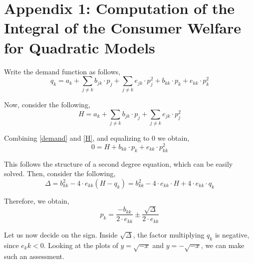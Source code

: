 \documentclass[12pt]{article}
\begin{document}
\newpage
\listoffigures

\newpage
\listoftables

\newpage
\section*{Appendix 1: Computation of the Integral of the Consumer Welfare for Quadratic Models}

Write the demand function as follows,
\begin{equation} \label{demand}
q_k = a_k + \sum_{j \neq k} b_{jk} \cdot p_j + \sum_{j \neq k} e_{jk} \cdot p_j^2 + b_{kk} \cdot p_k + e_{kk} \cdot p_k^2
\end{equation}

Now, consider the following,
\begin{equation} \label{H}
H = a_k + \sum_{j \neq k} b_{jk} \cdot p_j + \sum_{j \neq k} e_{jk} \cdot p_j^2
\end{equation}

Combining \ref{demand} and \ref{H}, and equalizing to $0$ we obtain,
\begin{equation*}
0 = H + b_{kk} \cdot p_k + e_{kk} \cdot p_{kk}^2
\end{equation*}

This follows the structure of a second degree equation, which can be easily solved. Then, consider the following,
\begin{equation*}
\Delta = b_{kk}^2 - 4 \cdot e_{kk} (H - q_k) = b_{kk}^2 - 4 \cdot e_{kk} \cdot H + 4 \cdot e_{kk} \cdot q_k 
\end{equation*}

Therefore, we obtain,
\begin{equation*}
p_k = \frac{-b_{kk}}{2 \cdot e_{kk}} \pm \frac{\sqrt{\Delta}}{2 \cdot e_{kk}}
\end{equation*}

Let us now decide on the sign. Inside $\sqrt{\Delta}$, the factor multiplying $q_k$ is negative, since $e_kk < 0$. Looking at the plots of $y = \sqrt{-x}$ and $y = -\sqrt{-x}$, we can make such an assessment.\\
\end{document}
